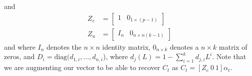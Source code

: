 and
\begin{equation}
	\begin{aligned}
		Z_c & = \begin{bmatrix}
			1 & 0_{1\times(p-1)}
		\end{bmatrix}\\
		Z_u & = \begin{bmatrix}
			I_n & 0_{n\times n (k-1)}
		\end{bmatrix}
	\end{aligned}
\end{equation}
and where $I_n$ denotes the $n\times n$ identity matrix, $0_{n\times k}$ denotes a $n\times k$ matrix of zeros, and $D_i = \text{diag}(d_{1,i}, \ldots, d_{n,i}$), where $d_j(L) = 1- \sum_{i=1}^k d_{j,i} L^i$. Note that we are augmenting our vector to be able to recover $C_t$ as $C_t = [Z_c \ 0 \ 1] \alpha_t$.

